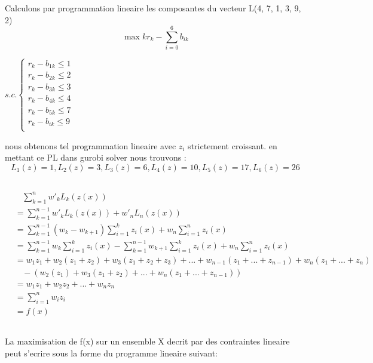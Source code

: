 \documentclass[16pt, a4paper]{article}
\begin{document}
\begin{flushleft}
\begin{justify}
Calculons par programmation lineaire les composantes du vecteur L(4, 7, 1, 3, 9, 2) 
$$ \max kr_{k} - \sum_{i=0}^6 b_{ik}$$
\begin{center}
\begin{math}
s.c. \begin{cases}
    r_k - b_{1k} \leq 1\\
    r_k - b_{2k} \leq 2\\
    r_k - b_{3k} \leq 3\\
    r_k - b_{4k} \leq 4\\
    r_k - b_{5k} \leq 7\\
    r_k - b_{ik} \leq 9\\
\end{cases}
\end{math}
\end{center}
nous obtenons tel programmation lineaire avec $z_i$ strictement croissant.
en mettant ce PL dans gurobi solver nous trouvons : 
$$ L_1(z) =1  , L_2(z) =3 , L_3(z) = 6 , L_4(z) = 10 , L_5(z) = 17 , L_6(z) = 26 $$ 

\subsection{}

\begin{align*}
& \ \ \ \ \sum_{k=1}^n w'_kL_k(z(x))\\
& =\sum_{k=1}^{n-1} w'_kL_k(z(x))+w'_nL_n(z(x))\\
& =\sum_{k=1}^{n-1}(w_k-w_{k+1})\sum_{i=1}^kz_i(x)+w_n\sum_{i=1}^nz_i(x)\\
& =\sum_{k=1}^{n-1}w_k\sum_{i=1}^kz_i(x)-\sum_{k=1}^{n-1}w_{k+1}\sum_{i=1}^kz_i(x)+w_n\sum_{i=1}^nz_i(x)\\
& =w_1z_1+w_2(z_1+z_2)+w_3(z_1+z_2+z_3)+...+w_{n-1}(z_1+...+z_{n-1})+w_n(z_1+...+z_n)\\
& \ \ \ \ -(w_2(z_1)+w_3(z_1+z_2)+...+w_n(z_1+...+z_{n-1}))\\
& =w_1z_1+w_2z_2+...+w_nz_n\\
& =\sum_{i=1}^nw_iz_i\\
& =f(x)
\end{align*}

\subsection{}
La maximisation de f(x) sur un ensemble X decrit par des contraintes lineaire peut s’ecrire sous la forme du programme lineaire suivant:


\end{justify}
\end{flushleft}
\end{document}
